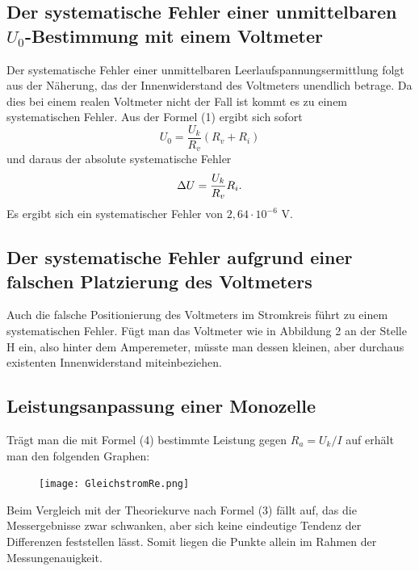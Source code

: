\subsection{Der systematische Fehler einer unmittelbaren $U_0$-Bestimmung mit einem Voltmeter}
Der systematische Fehler einer unmittelbaren Leerlaufspannungsermittlung folgt aus der Näherung, das
der Innenwiderstand des Voltmeters unendlich betrage. Da dies bei einem realen Voltmeter nicht der
Fall ist kommt es zu einem systematischen Fehler.
Aus der Formel (1) ergibt sich sofort
\begin{equation}
U_0 = \frac{U_k}{R_v}(R_v + R_i)
\end{equation}
und daraus der absolute systematische Fehler
\begin{equation}
\Delta U = \frac{U_k}{R_v}R_i \text.
\end{equation}
Es ergibt sich ein systematischer Fehler von $2,64 \cdot 10^{-6} $ V.





\subsection{Der systematische Fehler aufgrund einer falschen Platzierung des Voltmeters}
Auch die falsche Positionierung des Voltmeters im Stromkreis führt zu einem
systematischen Fehler. Fügt man das Voltmeter wie in Abbildung 2 an der Stelle H
ein, also hinter dem Amperemeter, müsste man dessen kleinen, aber durchaus existenten
Innenwiderstand miteinbeziehen.

\newpage
\subsection{Leistungsanpassung einer Monozelle}
Trägt man die mit Formel (4) bestimmte Leistung gegen $R_a = U_k/I$ auf erhält man
den folgenden Graphen:
\begin{figure}[H]
	\centering
	\caption{}
	\texttt{[image: GleichstromRe.png]}
	\label{fig:GleichstromLeistung}
\end{figure}
Beim Vergleich mit der Theoriekurve nach Formel (3) fällt auf, das die Messergebnisse zwar schwanken, aber sich keine eindeutige Tendenz der Differenzen feststellen lässt. Somit liegen die Punkte allein im Rahmen der Messungenauigkeit.
